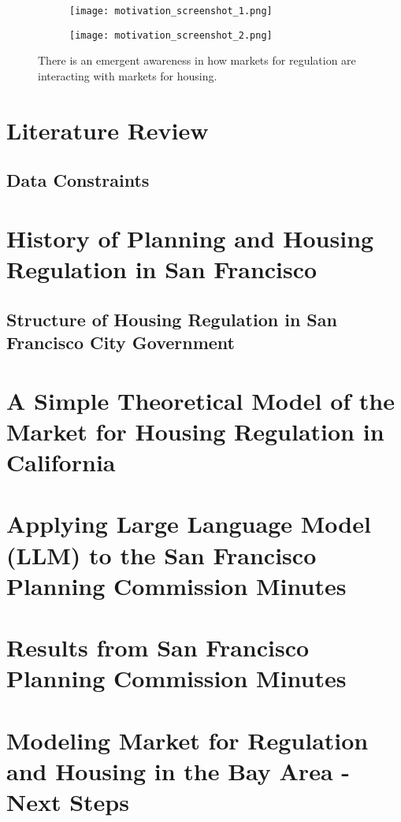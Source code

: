 \documentclass{article}
\begin{document}
\begin{figure}[hbt]
\centering

\begin{subfigure}[b]{0.8\textwidth}
    \centering
    \texttt{[image: motivation\_screenshot\_1.png]}
\end{subfigure}

\begin{subfigure}[b]{0.8\textwidth}
    \centering
    \texttt{[image: motivation\_screenshot\_2.png]}
\end{subfigure}
\caption{There is an emergent awareness in how markets for regulation are interacting with markets for housing.}
\label{fig:historic_prev_motivation}
\end{figure}

\section{Literature Review}



\subsection{Data Constraints}



\section{History of Planning and Housing Regulation in San Francisco}



\subsection{Structure of Housing Regulation in San Francisco City Government}




\section{A Simple Theoretical Model of the Market for Housing Regulation in California}



\section{Applying Large Language Model (LLM) to the San Francisco Planning Commission Minutes}



\section{Results from San Francisco Planning Commission Minutes}



\section{Modeling Market for Regulation and Housing in the Bay Area - Next Steps}


\clearpage

\printbibliography
\end{document}
